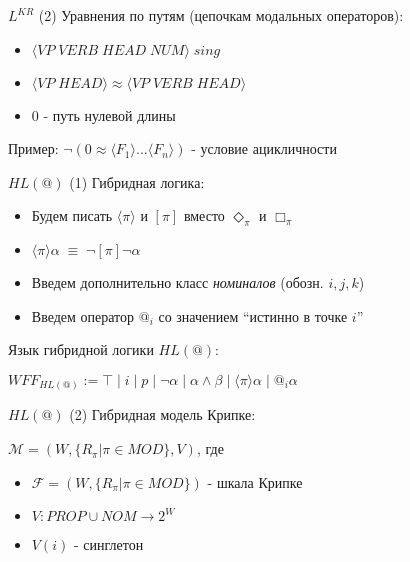 \documentclass{beamer}
\begin{document}
\begin{frame}{$L^{KR}$ (2)}
Уравнения по путям (цепочкам модальных операторов):\\
\bigskip
\begin{itemize}
	\item $\langle VP \; VERB \; HEAD \; NUM \rangle \; sing$
	\item $\langle VP \; HEAD \rangle \approx \langle VP \; VERB \; HEAD \rangle$
	\item $0$ - путь нулевой длины
\end{itemize}
\bigskip
Пример: $\neg(0 \approx \langle F_1 \rangle ... \langle F_n \rangle)$ - условие ацикличности
\end{frame}

\begin{frame}{$HL(@)$ (1)}
Гибридная логика:\\
\bigskip
\begin{itemize}
	\item Будем писать $\langle \pi \rangle$ и $[\pi]$ вместо $\Diamond_\pi$ и $\Box_\pi$
	\item $\langle \pi \rangle \alpha \; \equiv \; \neg [\pi] \neg \alpha$
	\item Введем дополнительно класс \textit{номиналов} (обозн. $i, j, k$)
	\item Введем оператор $@_i$ со значением ``истинно в точке $i$''
\end{itemize}
\bigskip
Язык гибридной логики $HL(@)$:\\
\begin{center}
$WFF_{HL(@)} := \top \; \vert \; i \; \vert \; p \; \vert \; \neg \alpha \; | \; \alpha \wedge \beta \; \vert \; \langle \pi \rangle \alpha \; \vert \; @_i \alpha$
\end{center}
\end{frame}

\begin{frame}{$HL(@)$ (2)}
Гибридная модель Крипке:\\
\bigskip
\begin{center}
$\mathcal{M} = (W, \{R_\pi \vert \pi \in MOD\}, V)$, где\\
\bigskip
\begin{itemize}
	\item $\mathcal{F} = (W, \{R_\pi \vert \pi \in MOD\})$ - шкала Крипке
	\item $V : PROP \cup NOM \to 2^W$
	\item $V(i)$ - синглетон
\end{itemize}
\end{center}
\end{frame}
\end{document}
